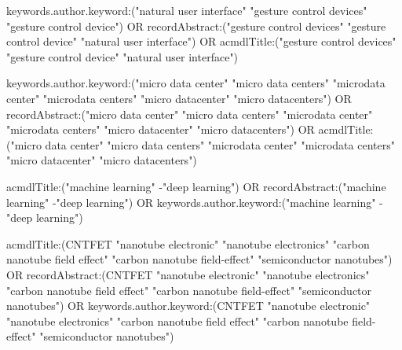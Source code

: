 
keywords.author.keyword:("natural user interface" "gesture control devices" "gesture control device") OR recordAbstract:("gesture control devices" "gesture control device" "natural user interface") OR acmdlTitle:("gesture control devices" "gesture control device" "natural user interface")

keywords.author.keyword:("micro data center" "micro data centers" "microdata center" "microdata centers" "micro datacenter" "micro datacenters") OR recordAbstract:("micro data center" "micro data centers" "microdata center" "microdata centers" "micro datacenter" "micro datacenters") OR acmdlTitle:("micro data center" "micro data centers" "microdata center" "microdata centers" "micro datacenter" "micro datacenters")

acmdlTitle:("machine learning" -"deep learning") OR recordAbstract:("machine learning" -"deep learning") OR keywords.author.keyword:("machine learning" -"deep learning")

acmdlTitle:(CNTFET "nanotube electronic" "nanotube electronics" "carbon nanotube field effect" "carbon nanotube field-effect" "semiconductor nanotubes") OR recordAbstract:(CNTFET "nanotube electronic" "nanotube electronics" "carbon nanotube field effect" "carbon nanotube field-effect" "semiconductor nanotubes") OR keywords.author.keyword:(CNTFET "nanotube electronic" "nanotube electronics" "carbon nanotube field effect" "carbon nanotube field-effect" "semiconductor nanotubes")